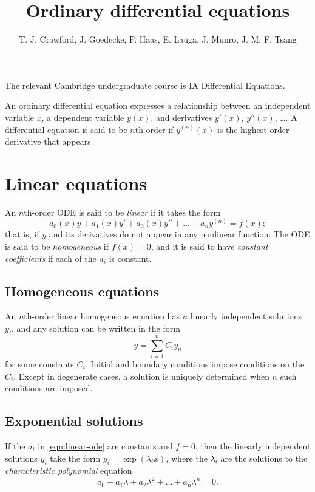 \documentclass{article}
\title{Ordinary differential equations}
\author{T. J. Crawford, J. Goedecke, P. Haas, E. Lauga, J. Munro, J. M. F. Tsang}
\begin{document}
\maketitle

The relevant Cambridge undergraduate course is IA Differential Equations.

An ordinary differential equation expresses a relationship between an
independent variable $x$, a dependent variable $y(x)$, and derivatives $y'(x)$,
$y''(x)$, \dots. A differential equation is said to be $n$th-order if
$y^{(n)}(x)$ is the highest-order derivative that appears.

\section{Linear equations}

An $n$th-order ODE is said to be \textit{linear} if it takes the form
\begin{equation} \label{eqn:linear-ode}
    a_0(x) y + a_1(x) y' + a_2(x) y'' + \dots + a_n y^{(n)} = f(x); 
\end{equation}
that is, if $y$ and its derivatives do not appear in any nonlinear function.
The ODE is said to be \textit{homogeneous} if $f(x) = 0$, and it is said to have
\textit{constant coefficients} if each of the $a_i$ is constant. 

\subsection{Homogeneous equations}

An $n$th-order linear homogeneous equation has $n$ linearly independent
solutions $y_i$, and any solution can be written in the form
$$ y = \sum_{i=1}^n C_i y_n $$
for some constants $C_i$. Initial and boundary conditions impose conditions on
the $C_i$. Except in degenerate cases, a solution is uniquely determined when
$n$ such conditions are imposed. 

\subsection{Exponential solutions}

If the $a_i$ in \ref{eqn:linear-ode} are constants and $f = 0$, then the
linearly independent solutions $y_i$ take the form $y_i = \exp(\lambda_i x)$,
where the $\lambda_i$ are the solutions to the \textit{characteristic
polynomial} equation
$$ a_0 + a_1 \lambda + a_2 \lambda^2 + \dots + a_n \lambda^n = 0. $$
\end{document}
